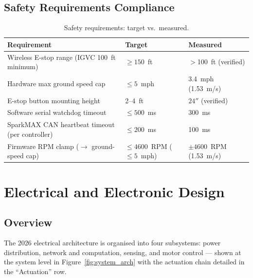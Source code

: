 \documentclass[12pt, letterpaper]{article}
\begin{document}
\subsection{Safety Requirements Compliance}

\begin{table}[H]
    \centering
    \small
    \caption{Safety requirements: target vs.\ measured.}
    \begin{tabularx}{\textwidth}{X l l}
        \toprule
        \textbf{Requirement} & \textbf{Target} & \textbf{Measured} \\
        \midrule
        Wireless E-stop range (IGVC 100~ft minimum)     & $\geq 150$~ft & $>$100~ft (verified) \\
        Hardware max ground speed cap                   & $\leq 5$~mph  & 3.4~mph (1.53~m/s) \\
        E-stop button mounting height                   & 2--4~ft       & $24''$ (verified) \\
        Software serial watchdog timeout                & $\leq 500$~ms & 300~ms \\
        SparkMAX CAN heartbeat timeout (per controller) & $\leq 200$~ms & 100~ms \\
        Firmware RPM clamp ($\to$ ground-speed cap)     & $\leq 4600$~RPM ($\leq 5$~mph) & $\pm 4600$~RPM (1.53~m/s) \\
        \bottomrule
    \end{tabularx}
\end{table}

\section{Electrical and Electronic Design}
\label{sec:electrical}

\subsection{Overview}

The 2026 electrical architecture is organised into four subsystems: power
distribution, network and computation, sensing, and motor control --- shown at the
system level in Figure~\ref{fig:system_arch} with the actuation chain detailed in the
``Actuation'' row.
\end{document}
